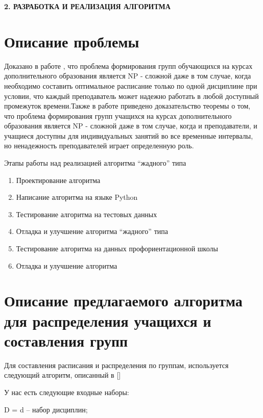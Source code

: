 \newpage
\begin{center}
  \textbf{\large 2. РАЗРАБОТКА И РЕАЛИЗАЦИЯ АЛГОРИТМА}
\end{center}


\section{Описание проблемы}

Доказано в  работе \cite{zakharova2022integer}, что проблема формирования групп обучающихся на курсах дополнительного образования является NP - сложной даже в том случае, когда необходимо составить оптимальное расписание только по одной дисциплине при условии, что каждый преподаватель может надежно работать в любой доступный промежуток времени.Также в работе \cite{zakharova2022integer} приведено доказательство теоремы о том, что проблема формирования групп учащихся на курсах дополнительного образования является NP - сложной даже в том случае, когда и преподаватели, и учащиеся доступны для индивидуальных занятий во все временные интервалы, но ненадежность преподавателей играет определенную роль.


Этапы работы над реализацией алгоритма “жадного” типа
\begin{enumerate}
    \item Проектирование алгоритма
    \item Написание алгоритма на языке Python
    \item Тестирование алгоритма на тестовых данных
    \item Отладка и улучшение алгоритма “жадного” типа
    \item Тестирование алгоритма на данных профориентационной школы
    \item Отладка и улучшение алгоритма
\end{enumerate}



\section{Описание предлагаемого алгоритма для распределения учащихся и составления групп}

Для составления расписания и распределения по группам, используется следующий алгоритм, описанный в []

У нас есть следующие входные наборы:

D = {d} – набор дисциплин;

